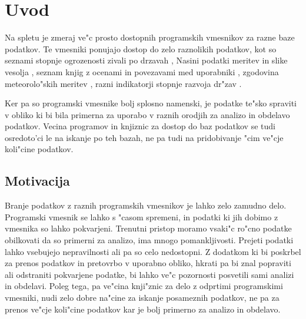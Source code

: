 \chapter{Uvod}

Na spletu je zmeraj ve"c prosto dostopnih programskih vmesnikov za razne
baze podatkov. Te vmesniki ponujajo dostop do zelo raznolikih podatkov, kot so 
seznami stopnje ogrozenosti zivali po drzavah 
, 
Nasini podatki meritev in slike vesolja 
, 
seznam knjig z ocenami in povezavami med uporabniki 
,
zgodovina meteorolo"skih meritev
, 
razni indikatorji stopnje razvoja dr"zav
.

Ker pa so programski vmesnike bolj splosno namenski, je
podatke te"sko spraviti v obliko ki bi bila primerna za uporabo v raznih 
orodjih za analizo in obdelavo podatkov. Vecina programov in knjiznic za dostop
do baz podatkov se tudi osredoto'ci le na iskanje po teh bazah, ne pa tudi na
pridobivanje "cim ve"cje koli"cine podatkov.






\section{Motivacija}

Branje podatkov z raznih programskih vmesnikov je lahko zelo zamudno delo.
Programski vmesnik se lahko s "casom spremeni, in podatki ki jih dobimo z
vmesnika so lahko pokvarjeni. Trenutni pristop moramo vsaki"c ro"cno podatke
obilkovati da so primerni za analizo, ima mnogo pomankljivosti. Prejeti podatki
lahko vsebujejo nepravilnosti ali pa so celo nedostopni. Z dodatkom ki bi
poskrbel za prenos podatkov in pretovrbo v uporabno obliko, hkrati pa bi znal
popraviti ali odstraniti pokvarjene podatke, bi lahko ve"c pozornosti posvetili
sami analizi in obdelavi. Poleg tega, pa ve"cina knji"znic za delo z odprtimi
programskimi vmesniki, nudi zelo dobre na"cine za iskanje posameznih podatkov,
ne pa za prenos ve"cje koli"cine podatkov kar je bolj primerno za analizo in
obdelavo.



